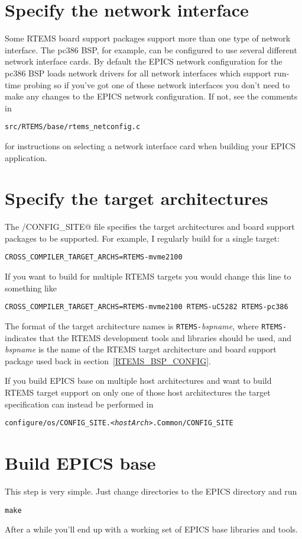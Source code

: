 \documentclass{report}
\begin{document}
\section{Specify the network interface}
Some RTEMS board support packages support more than one type of network interface.
The pc386 BSP, for example, can be configured to use several different
network interface cards.  By default the EPICS network configuration for
the pc386 BSP loads network drivers for all network interfaces which
support run-time probing so if you've got one of these network interfaces you
don't need to make any changes to the EPICS network configuration.
If not, see the comments in
\begin{alltt}
src/RTEMS/base/rtems_netconfig.c
\end{alltt}
for instructions on selecting a network interface card when building your
EPICS application.

\section{Specify the target architectures}
The \verb@configure/CONFIG_SITE@ file specifies the target
architectures and board support packages to be supported.
For example, I regularly build for a single target:
\begin{verbatim}
CROSS_COMPILER_TARGET_ARCHS=RTEMS-mvme2100
\end{verbatim}
If you want to build for multiple RTEMS targets you would change
this line to something like
\begin{verbatim}
CROSS_COMPILER_TARGET_ARCHS=RTEMS-mvme2100 RTEMS-uC5282 RTEMS-pc386
\end{verbatim}
The format of the target architecture names is {\tt RTEMS-}{\it bspname}, where
{\tt RTEMS-} indicates that the RTEMS development tools and libraries should
be used, and
{\it bspname} is the name of the RTEMS target architecture and
board support package used back in section~\ref{RTEMS_BSP_CONFIG}.

If you build EPICS base on multiple host architectures and want to build
RTEMS target support on only one of those host architectures the target
specification can instead be performed in 
\begin{alltt}
configure/os/CONFIG_SITE.<{\it{hostArch}}>.Common/CONFIG_SITE
\end{alltt}


\section{Build EPICS base}
This step is very simple.  Just change directories to the EPICS \verb@base@ directory
and run
\begin{verbatim}
make
\end{verbatim}
After a while you'll end up with a working set of EPICS base libraries and tools.
\end{document}
